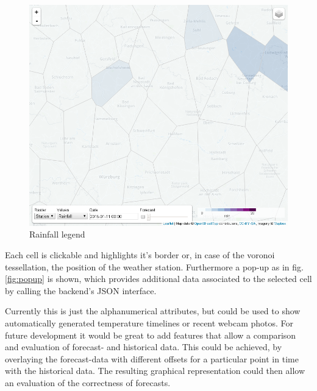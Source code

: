 \documentclass[paper=a4, fontsize=11pt]{article} %
\numberwithin{equation}{section} %
\numberwithin{figure}{section} %
\numberwithin{table}{section} %
\begin{document}
\begin{figure}[htbp]
\centering
\includegraphics[width=1\textwidth]{pictures/screenshot-legend-rain.png}
\caption{Rainfall legend}
\label{fig:rainfall-legend}
\end{figure}

Each cell is clickable and highlights it's border or, in case of the
voronoi tessellation, the position of the weather station. Furthermore a
pop-up as in fig. \ref{fig:popup} is shown, which provides additional data associated to the
selected cell by calling the backend's JSON interface.

Currently this is just the alphanumerical attributes, but could be used
to show automatically generated temperature timelines or recent webcam
photos.
For future development it would be great to add features that allow a comparison and evaluation of forecast- and historical data. This could be achieved, by overlaying the forecast-data with different offsets for a particular point in time with the historical data. The resulting graphical representation could then allow an evaluation of the correctness of forecasts.
\end{document}

